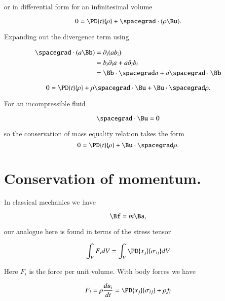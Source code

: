 or in differential form for an infinitesimal volume

\begin{equation}\label{eqn:continuumL10:70}
0 = \PD{t}{\rho} + \spacegrad \cdot (\rho \Bu).
\end{equation}

Expanding out the divergence term using

\begin{align*}
\spacegrad \cdot (a \Bb)
&=
\partial_i (a b_i) \\
&=
b_i \partial_i a 
+
a \partial_i b_i \\
&=
\Bb \cdot \spacegrad a
+ a \spacegrad \cdot \Bb
\end{align*}

\begin{equation}\label{eqn:continuumL10:90}
0 = \PD{t}{\rho} 
+ \rho \spacegrad \cdot \Bu
+ \Bu \cdot \spacegrad \rho.
\end{equation}

For an incompressible fluid 

\begin{equation}\label{eqn:continuumL10:110}
\spacegrad \cdot \Bu = 0
\end{equation}

so the conservation of mass equality relation takes the form
\begin{equation}\label{eqn:continuumL10:90b}
0 = \PD{t}{\rho} + \Bu \cdot \spacegrad \rho.
\end{equation}

\section{Conservation of momentum.}

In classical mechanics we have

\begin{equation}\label{eqn:continuumL10:130}
\Bf = m \Ba,
\end{equation}

our analogue here is found in terms of the stress tensor

\begin{equation}\label{eqn:continuumL10:150}
\int_V F_i dV = \int_V \PD{x_j}{\sigma_{ij}} dV
\end{equation}

Here $F_i$ is the force per unit volume.  With body forces we have

\begin{equation}\label{eqn:continuumL10:170}
F_i = \rho \frac{du_i}{dt} = \PD{x_j}{\sigma_{ij}} + \rho f_i
\end{equation}

